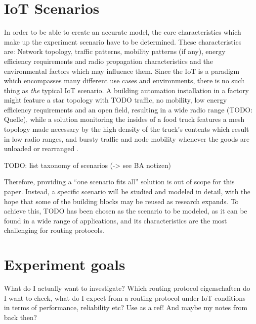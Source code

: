 \documentclass{acm_proc_article-sp}
\begin{document}

\section{IoT Scenarios}
\label{sec:Scenarios}

In order to be able to create an accurate model, the core characteristics which make up the experiment scenario have to be determined. These characteristics are: Network topology, traffic patterns, mobility patterns (if any), energy efficiency requirements and radio propagation characteristics and the environmental factors which may influence them.
Since the IoT is a paradigm which encompasses many different use cases and environments, there is no such thing as \emph{the} typical IoT scenario. A building automation installation in a factory might feature a star topology with TODO traffic, no mobility, low energy efficiency requirements and an open field, resulting in a wide radio range (TODO: Quelle), while a solution monitoring the insides of a food truck features a mesh topology made necessary by the high density of the truck's contents which result in low radio ranges, and bursty traffic and node mobility whenever the goods are unloaded or rearranged \cite{food_monitoring}.

TODO: list taxonomy of scenarios (-> see BA notizen)

Therefore, providing a ``one scenario fits all'' solution is out of scope for this paper. Instead, a specific scenario will be studied and modeled in detail, with the hope that some of the building blocks may be reused as research expands.
To achieve this, TODO has been chosen as the scenario to be modeled, as it can be found in a wide range of applications, and its characteristics are the most challenging for routing protocols.

\section{Experiment goals}
\label{sec:Goals}
What do I actually want to investigate? Which routing protocol eigenschaften do I want to check, what do I expect from a routing protocol under IoT conditions in terms of performance, reliability etc?
Use \cite{RFC-2501} as a ref! And maybe my notes from back then?
\end{document}
